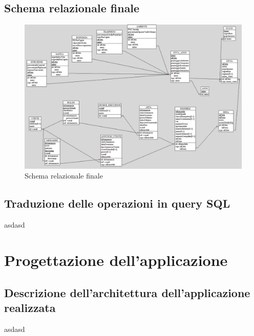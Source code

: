 \documentclass[a4paper,12pt]{report}
\begin{document}
            \section{Schema relazionale finale}
                \begin{figure}[H]
                    \centering{}
                    \includegraphics[width=\linewidth]{./images/relational_scheme.png}
                    \caption{Schema relazionale finale}
            \end{figure}
                
            \section{Traduzione delle operazioni in query SQL}
                asdasd
            
            
        \chapter{Progettazione dell'applicazione}
            
    	\section{Descrizione dell'architettura dell'applicazione realizzata}
        	asdasd
 
\end{document}
